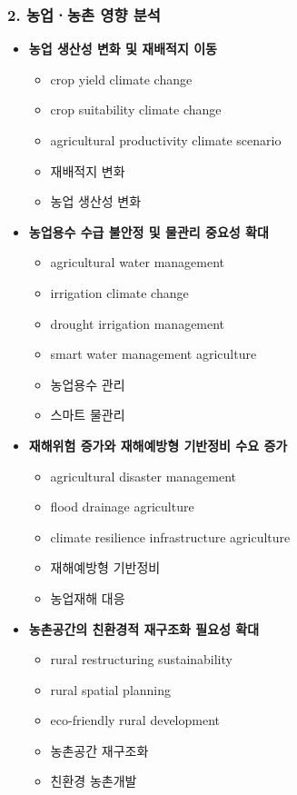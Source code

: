 \subsubsection*{2. 농업ㆍ농촌 영향 분석}

\begin{itemize}

    \item \textbf{농업 생산성 변화 및 재배적지 이동}
    \begin{itemize}
        \item crop yield climate change
        \item crop suitability climate change
        \item agricultural productivity climate scenario
        \item 재배적지 변화
        \item 농업 생산성 변화
    \end{itemize}

    \item \textbf{농업용수 수급 불안정 및 물관리 중요성 확대}
    \begin{itemize}
        \item agricultural water management
        \item irrigation climate change
        \item drought irrigation management
        \item smart water management agriculture
        \item 농업용수 관리
        \item 스마트 물관리
    \end{itemize}

    \item \textbf{재해위험 증가와 재해예방형 기반정비 수요 증가}
    \begin{itemize}
        \item agricultural disaster management
        \item flood drainage agriculture
        \item climate resilience infrastructure agriculture
        \item 재해예방형 기반정비
        \item 농업재해 대응
    \end{itemize}

    \item \textbf{농촌공간의 친환경적 재구조화 필요성 확대}
    \begin{itemize}
        \item rural restructuring sustainability
        \item rural spatial planning
        \item eco-friendly rural development
        \item 농촌공간 재구조화
        \item 친환경 농촌개발
    \end{itemize}

\end{itemize}

